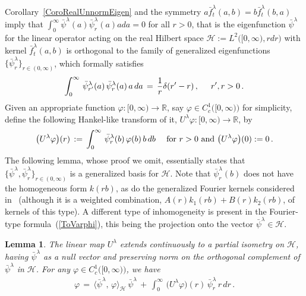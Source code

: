 \documentclass[10pt]{article}
\numberwithin{equation}{section}
\newtheorem{lemma}[theorem]{Lemma}
\theoremstyle{definition}
\newcommand{\R}{{\mathbb R}}
\begin{document}
\begin{appendix}
 Corollary~\ref{CoroRealUnnormEigen} and the symmetry $ a\bar{f}_t^{\lambda}(a,b)=b\bar{f}_t^{\lambda}(b,a) $ imply that $\int_0^{\infty}\bar{\psi}^{\lambda}(a)\bar{\psi}^{\lambda}_r(a)ada=0 $ for all $r>0$, that is the eigenfunction $\bar{\psi}^{\lambda}$ for the linear operator acting on the real Hilbert space $\mathcal{H}:=L^2\big([0,\infty), rdr\big)$ with kernel $\bar{f}^{\lambda}_t(a,b)$  is orthogonal to the family of generalized eigenfunctions $\{\bar{\psi}^{\lambda}_r\}_{r\in (0,\infty)}$, which formally satisfies
 \begin{align*}
 \int_0^{\infty}\, \bar{\psi}^{\lambda}_{r'}(a)\, \bar{\psi}^{\lambda}_{r}(a) \,a\,da   \,=\, \frac{1}{r}\delta(r'-r)\,,\hspace{.5cm}r',r>0\,.
 \end{align*}
 Given an appropriate function $\varphi:[0,\infty)\rightarrow \R$, say $\varphi\in  C_c^1\big([0,\infty)  \big)  
 $ for simplicity, define the following  Hankel-like transform of it, $U^{\lambda}\varphi:[0,\infty)\rightarrow \R$,   by  
$$ \big(U^{\lambda}\varphi\big)(r)\,:=\, \int_0^{\infty}\, \bar{\psi}^{\lambda}_r(b)\,\varphi(b) \,b\,db\, \hspace{.4cm}\text{for  $r>0$ and $\big(U^{\lambda}\varphi\big)(0):=0$\,.}  $$
The following lemma, whose proof we omit, essentially states that $\{\bar{\psi}^{\lambda}, \bar{\psi}^{\lambda}_{r}\}_{r\in (0,\infty)}$ is a  generalized basis for $\mathcal{H}$. Note that $\bar{\psi}^{\lambda}_r(b)$ does not have the homogeneous form $k(rb)$, as do the generalized Fourier kernels considered in~\cite[Ch.\ VIII]{Titch} (although it is a weighted combination, $ A(r) k_1(rb)+ B(r) k_2(rb) $, of kernels of this type).  A different type of inhomogeneity is present in the Fourier-type formula~(\ref{ToVarphi}), this being the   projection onto the vector $\bar{\psi}^{\lambda}\in \mathcal{H}$. 
\begin{lemma}\label{LemHankel}  The linear map $U^{\lambda}$ extends continuously to a partial isometry on $\mathcal{H}$, having $\bar{\psi}^{\lambda}$ as a null vector   and preserving norm on the orthogonal complement of  $\bar{\psi}^{\lambda}$ in $ \mathcal{H} $.   For any $\varphi\in   C_c^1\big([0,\infty)  \big)  $, we have 
\begin{align}\label{ToVarphi}
\varphi\,=\,\big\langle \bar{\psi}^{\lambda} ,\, \varphi\big\rangle_{\mathcal{H}}\,\bar{\psi}^{\lambda}  \,+\, \int_0^{\infty}\,\big(U^{\lambda}\varphi\big)(r)\,\bar{\psi}^{\lambda}_r\,r\, dr\,.  
\end{align} 
\end{lemma}



\end{appendix}
\end{document}
